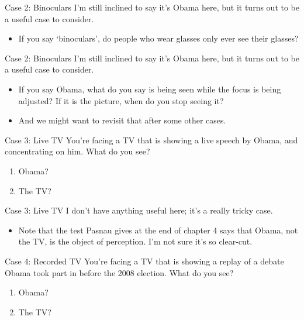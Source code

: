 \documentclass[
  17pt,
  letterpaper,
  ignorenonframetext,
  aspectratio=169,
  handout]{beamer}
\providecommand{\tightlist}{%
  \setlength{\itemsep}{0pt}\setlength{\parskip}{0pt}}\usepackage{longtable,booktabs,array}
\begin{document}
\begin{frame}{Case 2: Binoculars}
\protect\hypertarget{case-2-binoculars-1}{}
I'm still inclined to say it's Obama here, but it turns out to be a
useful case to consider.

\begin{itemize}[<+->]
\tightlist
\item
  If you say `binoculars', do people who wear glasses only ever see
  their glasses?
\end{itemize}
\end{frame}

\begin{frame}{Case 2: Binoculars}
\protect\hypertarget{case-2-binoculars-2}{}
I'm still inclined to say it's Obama here, but it turns out to be a
useful case to consider.

\begin{itemize}[<+->]
\tightlist
\item
  If you say Obama, what do you say is being seen while the focus is
  being adjusted? If it is the picture, when do you stop seeing it?
\item
  And we might want to revisit that after some other cases.
\end{itemize}
\end{frame}

\begin{frame}{Case 3: Live TV}
\protect\hypertarget{case-3-live-tv}{}
You're facing a TV that is showing a live speech by Obama, and
concentrating on him. What do you see?

\begin{enumerate}[<+->]
\tightlist
\item
  Obama?
\item
  The TV?
\end{enumerate}
\end{frame}

\begin{frame}{Case 3: Live TV}
\protect\hypertarget{case-3-live-tv-1}{}
I don't have anything useful here; it's a really tricky case.

\begin{itemize}[<+->]
\tightlist
\item
  Note that the test Pasnau gives at the end of chapter 4 says that
  Obama, not the TV, is the object of perception. I'm not sure it's so
  clear-cut.
\end{itemize}
\end{frame}

\begin{frame}{Case 4: Recorded TV}
\protect\hypertarget{case-4-recorded-tv}{}
You're facing a TV that is showing a replay of a debate Obama took part
in before the 2008 election. What do you see?

\begin{enumerate}[<+->]
\tightlist
\item
  Obama?
\item
  The TV?
\end{enumerate}
\end{frame}
\end{document}
